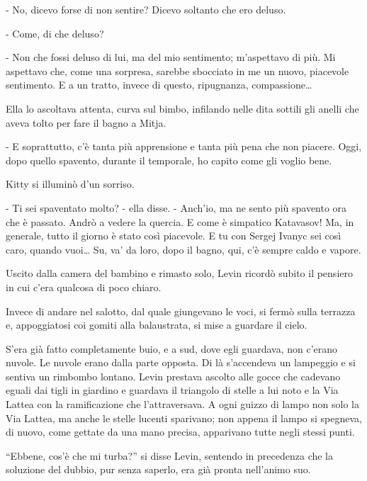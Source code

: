 - No, dicevo forse di non sentire? Dicevo soltanto che ero deluso. 

- Come, di che deluso? 

- Non che fossi deluso di lui, ma del mio sentimento; m'aspettavo di più. Mi aspettavo che, come una sorpresa, sarebbe sbocciato in me un nuovo, piacevole sentimento. E a un tratto, invece di questo, ripugnanza, compassione\ldots{} 

Ella lo ascoltava attenta, curva sul bimbo, infilando nelle dita sottili gli anelli che aveva tolto per fare il bagno a Mitja. 

- E soprattutto, c'è tanta più apprensione e tanta più pena che non piacere. Oggi, dopo quello spavento, durante il temporale, ho capito come gli voglio bene. 

Kitty si illuminò d'un sorriso. 

- Ti sei spaventato molto? - ella disse. - Anch'io, ma ne sento più spavento ora che è passato. Andrò a vedere la quercia. E come è simpatico Katavasov! Ma, in generale, tutto il giorno è stato così piacevole. E tu con Sergej Ivanyc sei così caro, quando vuoi\ldots{} Su, va' da loro, dopo il bagno, qui, c'è sempre caldo e vapore. 

Uscito dalla camera del bambino e rimasto solo, Levin ricordò subito il pensiero in cui c'era qualcosa di poco chiaro. 

Invece di andare nel salotto, dal quale giungevano le voci, si fermò sulla terrazza e, appoggiatosi coi gomiti alla balaustrata, si mise a guardare il cielo. 

S'era già fatto completamente buio, e a sud, dove egli guardava, non c'erano nuvole. Le nuvole erano dalla parte opposta. Di là s'accendeva un lampeggio e si sentiva un rimbombo lontano. Levin prestava ascolto alle gocce che cadevano eguali dai tigli in giardino e guardava il triangolo di stelle a lui noto e la Via Lattea con la ramificazione che l'attraversava. A ogni guizzo di lampo non solo la Via Lattea, ma anche le stelle lucenti sparivano; non appena il lampo si spegneva, di nuovo, come gettate da una mano precisa, apparivano tutte negli stessi punti. 

``Ebbene, cos'è che mi turba?'' si disse Levin, sentendo in precedenza che la soluzione del dubbio, pur senza saperlo, era già pronta nell'animo suo. 

